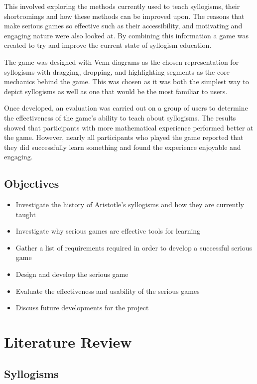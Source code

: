 \documentclass[12pt,a4paper]{report}
\begin{document}
This involved exploring the methods currently used to teach syllogisms, their shortcomings and how these methods can be improved upon. The reasons that make serious games so effective such as their accessibility, and motivating and engaging nature were also looked at. By combining this information a game was created to try and improve the current state of syllogism education.

The game was designed with Venn diagrams as the chosen representation for syllogisms with dragging, dropping, and highlighting segments as the core mechanics behind the game. This was chosen as it was both the simplest way to depict syllogisms as well as one that would be the most familiar to users.

Once developed, an evaluation was carried out on a group of users to determine the effectiveness of the game's ability to teach about syllogisms. The results showed that participants with more mathematical experience performed better at the game. However, nearly all participants who played the game reported that they did successfully learn something and found the experience enjoyable and engaging. 

\section{Objectives}

\begin{itemize}
  \item Investigate the history of Aristotle's syllogisms and how they are currently taught
  \item Investigate why serious games are effective tools for learning
  \item Gather a list of requirements required in order to develop a successful serious game
  \item Design and develop the serious game
  \item Evaluate the effectiveness and usability of the serious games
  \item Discuss future developments for the project
\end{itemize}


\chapter{Literature Review}
\section{Syllogisms}
\end{document}
